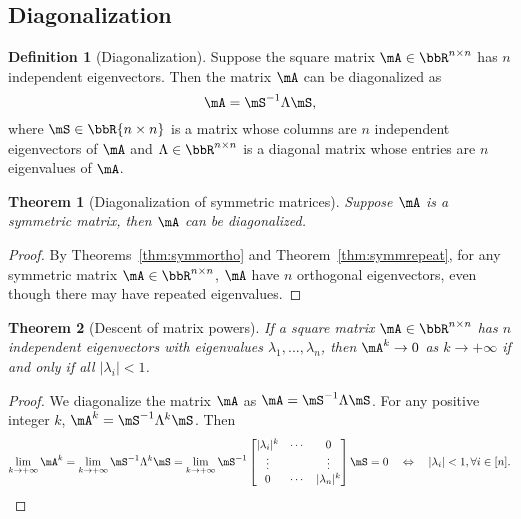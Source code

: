 \documentclass[11pt]{article}
\theoremstyle{plain}
\newtheorem{thm}{Theorem}[section]
\theoremstyle{definition}
\newtheorem{defn}{Definition}
\begin{document}
\subsection{Diagonalization}

\begin{defn}[Diagonalization]
	Suppose the square matrix $\mA \in \bbR^{n \times n}$ has $n$ independent eigenvectors. Then the matrix $\mA$ can be diagonalized as
	\[ \mA = \mS^{-1} \Lambda \mS, \]
	where $\mS \in \bbR{n \times n}$ is a matrix whose columns are $n$ independent eigenvectors of $\mA$ and $\Lambda \in \bbR^{n \times n}$ is a diagonal matrix whose entries are $n$ eigenvalues of $\mA$.
\end{defn}

\begin{thm}[Diagonalization of symmetric matrices]
Suppose $\mA$ is a symmetric matrix, then $\mA$ can be diagonalized.
\end{thm}

\begin{proof}
	By Theorems~\ref{thm:symmortho} and Theorem~\ref{thm:symmrepeat}, for any symmetric matrix $\mA \in \bbR^{n \times n}$, $\mA$ have $n$ orthogonal eigenvectors, even though there may have repeated eigenvalues.
\end{proof}

\begin{thm}[Descent of matrix powers]
	If a square matrix $\mA \in \bbR^{n \times n}$ has $n$ independent eigenvectors with eigenvalues $\lambda_1,...,\lambda_n$, then $\mA^k \rightarrow 0$ as $k \rightarrow +\infty$ if and only if all $|\lambda_i| < 1$.
\end{thm}

\begin{proof}
	We diagonalize the matrix $\mA$ as $\mA =\mS^{-1} \Lambda \mS$. For any positive integer $k$, $\mA^k = \mS^{-1} \Lambda^{k} \mS$. Then 
	\[ \lim_{k \rightarrow +\infty} \mA^k = \lim_{k \rightarrow +\infty} \mS^{-1} \Lambda^{k} \mS  =  \lim_{k \rightarrow +\infty} \mS^{-1} \begin{bmatrix}
		|\lambda_i|^k & \cdots &0\\
		\vdots & &\vdots\\
		0 & \cdots & |\lambda_n|^k
	\end{bmatrix} \mS  = 0 \quad \Leftrightarrow \quad  |\lambda_i| < 1, \forall i \in [n]. \]
\end{proof}
\end{document}
